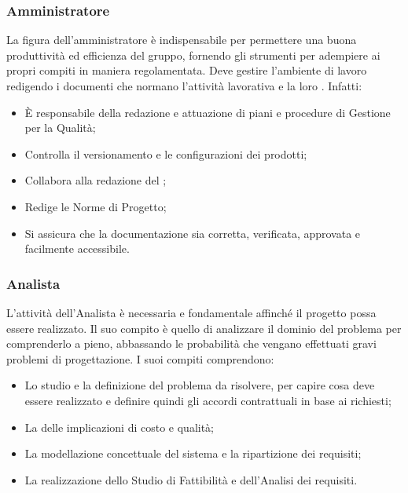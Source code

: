 \documentclass[NormeDiProgetto.tex]{subfiles}
\begin{document}
	\subsubsection{Amministratore}
	La figura dell'amministratore è indispensabile per permettere una buona produttività ed efficienza del gruppo, fornendo gli strumenti per adempiere ai propri compiti in maniera regolamentata. Deve gestire l'ambiente di lavoro redigendo i documenti che normano l'attività lavorativa e la loro . Infatti:
	\begin{itemize}
		\item È responsabile della redazione e attuazione di piani e procedure di Gestione per la Qualità;
		\item Controlla il versionamento e le configurazioni dei prodotti;
		\item Collabora alla redazione del \pdp;
		\item Redige le Norme di Progetto;
		\item Si assicura che la documentazione sia corretta, verificata, approvata e facilmente accessibile.
	\end{itemize}

	\subsubsection{Analista}
	L'attività dell'Analista è necessaria e fondamentale affinché il progetto possa essere realizzato. Il suo compito è quello di analizzare il dominio del problema per comprenderlo a pieno, abbassando le probabilità che vengano effettuati gravi problemi di progettazione. I suoi compiti comprendono:
	\begin{itemize}
		\item Lo studio e la definizione del problema da risolvere, per capire cosa deve essere realizzato e definire quindi gli accordi contrattuali in base ai  richiesti;
		\item La  delle implicazioni di costo e qualità;
		\item La modellazione concettuale del sistema e la ripartizione dei requisiti;
		\item La realizzazione dello Studio di Fattibilità e dell'Analisi dei requisiti.
	\end{itemize}
\end{document}
